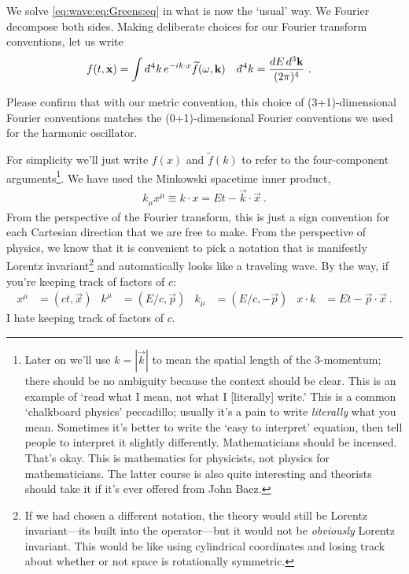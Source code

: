 We solve \eqref{eq:wave:eq:Greens:eq} in what is now the `usual' way. We Fourier decompose both sides. Making deliberate choices for our Fourier transform conventions, let us write
\begin{align}
	f(t,\vec{x}) &= \int \dbar^4k \, e^{-ik\cdot x} \tilde f(\omega, \vec{k})
	&
	\dbar^4k &= \frac{dE\, d^3\vec{k}}{(2\pi)^4}
	 \ .
\end{align}
\begin{exercise}
Please confirm that with our metric convention, this choice of (3+1)-dimensional Fourier conventions matches the (0+1)-dimensional Fourier conventions we used for the harmonic oscillator.
\end{exercise}
For simplicity we'll just write $f(x)$ and $\tilde f(k)$ to refer to the four-component arguments\footnote{Later on we'll use $k=|\vec{k}|$ to mean the spatial length of the 3-momentum; there should be no ambiguity because the context should be clear. This is an example of `read what I mean, not what I [literally] write.' This is a common `chalkboard physics' peccadillo; usually it's a pain to write \emph{literally} what you mean. Sometimes it's better to write the `easy to interpret' equation, then tell people to interpret it slightly differently. Mathematicians should be incensed. That's okay. This is mathematics for physicists, not physics for mathematicians. The latter course is also quite interesting and theorists should take it if it's ever offered from John Baez.}. 
We have used the Minkowski spacetime inner product,
\begin{align}
	k_\mu x^\mu \equiv k\cdot x = Et - \vec{k}\cdot\vec{x} \ .
\end{align}
From the perspective of the Fourier transform, this is just a sign convention for each Cartesian direction that we are free to make. From the perspective of physics, we know that it is convenient to pick a notation that is manifestly Lorentz invariant\footnote{If we had chosen a different notation, the theory would still be Lorentz invariant---its built into the operator---but it would not be \emph{obviously} Lorentz invariant. This would be like using cylindrical coordinates and losing track about whether or not space is rotationally symmetric.} and automatically looks like a traveling wave. By the way, if you're keeping track of factors of $c$:
\begin{align}
	x^\mu &= (ct,\vec{x})
	&
	k^\mu &= (E/c,\vec{p})
	&
	k_\mu &= (E/c, -\vec{p})
	&
	x\cdot k  &= Et - \vec{p}\cdot\vec{x} \ .
\end{align}
I hate keeping track of factors of $c$. 


